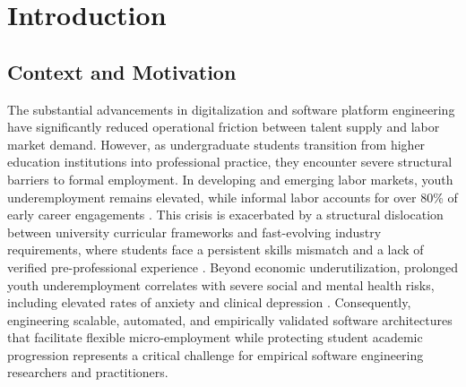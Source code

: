 \documentclass[a4paper,fleqn]{cas-dc}
\begin{document}
\maketitle

\section{Introduction}
\label{sec:intro}

\subsection{Context and Motivation}
The substantial advancements in digitalization and software platform engineering have significantly reduced operational friction between talent supply and labor market demand. However, as undergraduate students transition from higher education institutions into professional practice, they encounter severe structural barriers to formal employment. In developing and emerging labor markets, youth underemployment remains elevated, while informal labor accounts for over 80\% of early career engagements \cite{ilo2024}. This crisis is exacerbated by a structural dislocation between university curricular frameworks and fast-evolving industry requirements, where students face a persistent skills mismatch and a lack of verified pre-professional experience \cite{valencia2023}. Beyond economic underutilization, prolonged youth underemployment correlates with severe social and mental health risks, including elevated rates of anxiety and clinical depression \cite{yang2024, dupere2025}. Consequently, engineering scalable, automated, and empirically validated software architectures that facilitate flexible micro-employment while protecting student academic progression represents a critical challenge for empirical software engineering researchers and practitioners.
\end{document}
